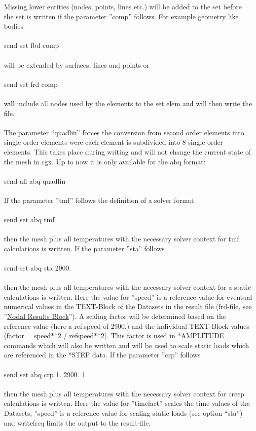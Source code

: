 \documentclass{article}
\providecommand{\htmlref}[2]{\hyperref[#2]{#1}}
\begin{document}
Missing lower entities (nodes, points, lines etc.)  will be added to the set before the set is written if the parameter ''comp'' follows. For example geometry like bodies\\\\send set fbd comp\\\\will be extended by surfaces, lines and points or\\\\send set frd comp\\\\will include all nodes used by the elements to the set elem and will then write the file.\\\\
The parameter ``quadlin'' forces the conversion from second order elements into single order elements were each element is subdivided into 8 single order elements. This takes place during writing and will not change the current state of the mesh in cgx. Up to now it is only available for the abq format:\\\\send all abq quadlin\\\\
If the parameter ''tmf'' follows the definition of a solver format\\\\send set abq tmf\\\\then the mesh plus all temperatures with the necessary solver context for tmf calculations is written. If the parameter ''sta'' follows \\\\send set abq sta 2900.\\\\then the mesh plus all temperatures with the necessary solver context for a static calculations is written. Here the value for ''speed'' is a reference value for eventual numerical values in the TEXT-Block of the Datasets in the result file (frd-file, see ''\htmlref{Nodal Results Block}{Nodal Results Block}''). A scaling factor will be determined based on the reference value (here a ref.speed of 2900.) and the individual TEXT-Block values (factor = speed**2 / refspeed**2). This factor is used in *AMPLITUDE commands which will also be written and will be used to scale static loads which are referenced in the *STEP data. If the parameter ''crp'' follows \\\\send set abq crp 1. 2900. 1\\\\then the mesh plus all temperatures with the necessary solver context for creep calculations is written. Here the value for ''timefact'' scales the time-values of the Datasets, ''speed'' is a reference value for scaling static loads (see option ``sta'') and writefreq limits the output to the result-file.\\\\
\end{document}
